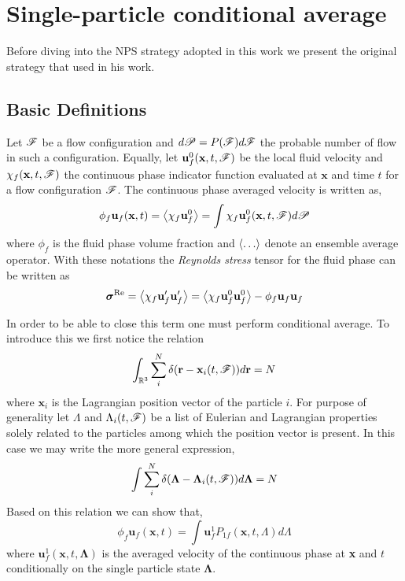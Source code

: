 \documentclass[11pt]{My_preprint}
\begin{document}
\section{Single-particle conditional average}

Before diving into the NPS strategy adopted in this work we present the original strategy that \citet{van1982bubble} used in his work. 

\subsection{Basic Definitions}
Let $\mathscr{F}$ be a flow configuration and $d\mathscr{P} = P(\mathscr{F})d\mathscr{F}$ the probable number of flow in such a configuration. 
Equally, let $\textbf{u}_f^0(\textbf{x},t,\mathscr{F})$ be the local fluid velocity and $\chi_f(\textbf{x},t,\mathscr{F})$ the continuous phase indicator function evaluated at $\textbf{x}$ and time $t$ for a flow configuration $\mathscr{F}$. 
The continuous phase averaged velocity is written as, 
\begin{equation}
    \phi_f \textbf{u}_f(\textbf{x},t)
    = \left<\chi_f \textbf{u}_f^0\right> 
    = \int  \chi_f \textbf{u}_f^0(\textbf{x},t,\mathscr{F}) d\mathscr{P}
\end{equation}
where $\phi_f$ is the fluid phase volume fraction and $\left<\ldots\right>$ denote an ensemble average operator. 
With these notations the \textit{Reynolds stress} tensor for the fluid phase can be written as 
\begin{equation}
    \bm\sigma^\text{Re}
    =\left<\chi_f \textbf{u}_f'\textbf{u}_f'\right>
    =\left<\chi_f \textbf{u}_f^0 \textbf{u}_f^0 \right>
    - \phi_f \textbf{u}_f \textbf{u}_f
\end{equation}

In order to be able to close this term one must perform conditional average. 
To introduce this we first notice the relation 
\begin{equation}
    \int_{\mathbb{R}^3}
    \sum_i^N \delta(\textbf{r}-\textbf{x}_i(t,\mathscr{F}))
    d\textbf{r}
    = N 
\end{equation}
where $\textbf{x}_i$ is the Lagrangian position vector of the particle $i$. 
For purpose of generality let $\Lambda$ and $\Lambda_i(t,\mathscr{F})$ be a list of Eulerian and Lagrangian properties solely related to the particles among which the position vector is present. 
In this case we may write the more general expression, 
\begin{equation}
    \int
    \sum_i^N \delta(\bm\Lambda-\bm\Lambda_i(t,\mathscr{F}))
    d\bm\Lambda
    = N 
\end{equation}
Based on this relation we can show that, 
\begin{equation}
    \phi_f \textbf{u}_f(\textbf{x},t)
    = 
    \int 
    \textbf{u}^1_f 
    P_{1f}(\textbf{x},t,\Lambda)
    d\Lambda
\end{equation}
where $\textbf{u}^1_f(\textbf{x},t,\bm\Lambda)$ is the averaged velocity of the continuous phase at \textbf{x} and $t$ conditionally on the single particle state $\bm\Lambda$. 
\end{document}
